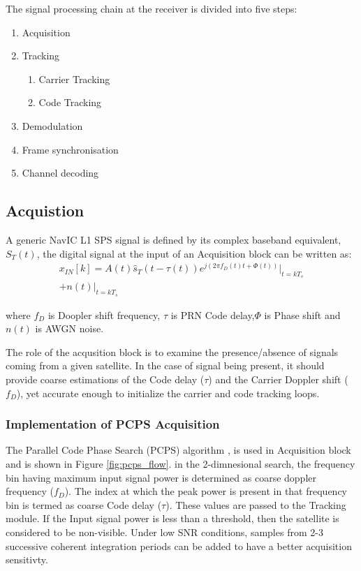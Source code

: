 \documentclass[conference]{IEEEtran}
\begin{document}
The signal processing chain at the receiver is divided into five steps:
\begin{enumerate}
	\item Acquisition
	\item Tracking
	\begin{enumerate}
		\item Carrier Tracking
		\item Code Tracking
	\end{enumerate}
	\item Demodulation
	\item Frame synchronisation
	\item Channel decoding
\end{enumerate}

\subsection{Acquistion}

A generic NavIC L1 SPS signal is defined by its complex baseband equivalent, 
$S_T(t)$, the digital signal at the input of an Acquisition block can be written as:
\begin{multline}
	x_{IN}[k]=A(t)\hat s_T (t-\tau(t))e^{j(2 \pi f_D(t)t+\Phi(t))}\bigg|_{t=kT_s} \\ 
    +n(t)\bigg|_{t=kT_s}
\end{multline}

\noindent where $f_D$ is Doopler shift frequency, $\tau$ is PRN Code delay,$\Phi$ is Phase shift
and $n(t)$ is AWGN noise. 

The role of the acqusition block is to examine the presence/absence of signals coming from a 
given satellite. In the case of signal being present, it should provide coarse estimations of the 
Code delay ($\tau$) and the Carrier Doppler shift ($f_D$), yet accurate enough to initialize the carrier and code 
tracking loops.

\subsubsection{Implementation of PCPS Acquisition}
The Parallel Code Phase Search (PCPS) algorithm \cite{b1},\cite{b3} is used in Acquisition block 
and is shown in Figure \ref{fig:pcps_flow}. in the 2-dimnesional search, the frequency bin having 
maximum input signal power is determined as coarse doppler frequency ($f_D$). 
The index at which the peak power is present in that frequency bin is termed as coarse Code delay 
($\tau$). These values are 
passed to the Tracking module. If the Input signal power is less than a threshold, then the 
satellite is 
considered to be non-visible. Under low SNR conditions, samples from 2-3 successive coherent 
integration periods can be added to have a better acquisition sensitivty.
\end{document}
